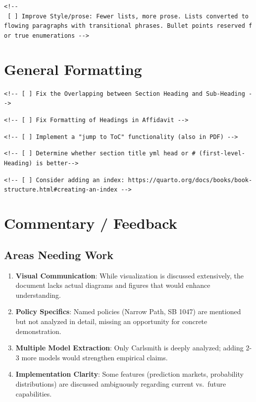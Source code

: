 \documentclass[
  11pt,
  letterpaper,
]{book}
\begin{document}
\texttt{\textless{}!-\/-\ {[}\ {]}\ Improve\ Style/prose:\ Fewer\ lists,\ more\ prose.\ Lists\ converted\ to\ flowing\ paragraphs\ with\ transitional\ phrases.\ Bullet\ points\ reserved\ for\ true\ enumerations\ -\/-\textgreater{}}

\section{General Formatting}\label{general-formatting}

\texttt{\textless{}!-\/-\ {[}\ {]}\ Fix\ the\ Overlapping\ between\ Section\ Heading\ and\ Sub-Heading\ -\/-\textgreater{}}

\texttt{\textless{}!-\/-\ {[}\ {]}\ Fix\ Formatting\ of\ Headings\ in\ Affidavit\ -\/-\textgreater{}}

\texttt{\textless{}!-\/-\ {[}\ {]}\ Implement\ a\ "jump\ to\ ToC"\ functionality\ (also\ in\ PDF)\ -\/-\textgreater{}}

\texttt{\textless{}!-\/-\ {[}\ {]}\ Determine\ whether\ section\ title\ yml\ head\ or\ \#\ (first-level-Heading)\ is\ better-\/-\textgreater{}}

\texttt{\textless{}!-\/-\ {[}\ {]}\ Consider\ adding\ an\ index:\ https://quarto.org/docs/books/book-structure.html\#creating-an-index\ -\/-\textgreater{}}

\section{Commentary / Feedback}\label{commentary-feedback}

\subsection{Areas Needing Work}\label{areas-needing-work}

\begin{enumerate}
\def\labelenumi{\arabic{enumi}.}
\item
  \textbf{Visual Communication}: While visualization is discussed
  extensively, the document lacks actual diagrams and figures that would
  enhance understanding.
\item
  \textbf{Policy Specifics}: Named policies (Narrow Path, SB 1047) are
  mentioned but not analyzed in detail, missing an opportunity for
  concrete demonstration.
\item
  \textbf{Multiple Model Extraction}: Only Carlsmith is deeply analyzed;
  adding 2-3 more models would strengthen empirical claims.
\item
  \textbf{Implementation Clarity}: Some features (prediction markets,
  probability distributions) are discussed ambiguously regarding current
  vs.~future capabilities.
\end{enumerate}
\end{document}
